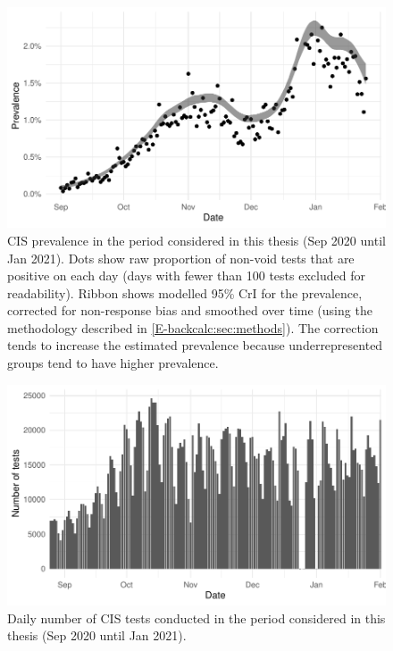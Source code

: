 \documentclass[thesis.tex]{subfiles}
\begin{document}
\begin{figure}
  \centering \includegraphics[width=\textwidth]{biology-data/CIS-positivity}
  \caption[CIS prevalence]{%
    CIS prevalence in the period considered in this thesis (Sep 2020 until Jan 2021).
    Dots show raw proportion of non-void tests that are positive on each day (days with fewer than 100 tests excluded for readability).
    Ribbon shows modelled 95\% CrI for the prevalence, corrected for non-response bias and smoothed over time (using the methodology described in \cref{E-backcalc:sec:methods}).
    The correction tends to increase the estimated prevalence because underrepresented groups tend to have higher prevalence.
  }
  \label{biology-data:fig:CIS-positivity}
\end{figure}
\begin{figure}
  \centering \includegraphics[width=\textwidth]{biology-data/CIS-num-tests}
  \caption[Number of CIS tests]{%
    Daily number of CIS tests conducted in the period considered in this thesis (Sep 2020 until Jan 2021).
  }
  \label{biology-data:fig:CIS-num-tests}
\end{figure}
\end{document}
